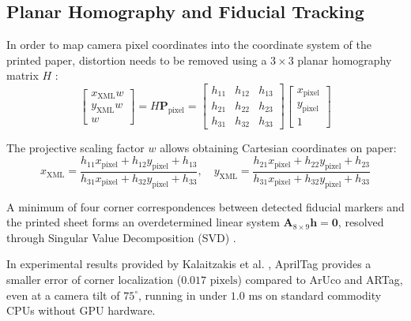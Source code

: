 \subsection{Planar Homography and Fiducial Tracking}
\label{subsec:lit_homography}
In order to map camera pixel coordinates into the coordinate system of the printed paper, distortion needs to be removed using a $3 \times 3$ planar homography matrix $H$ \cite{LonguetHiggins1985Machine, Pirchheim2011Homography, Wang2020Relative}:
\begin{equation}
\begin{bmatrix}
x_{\text{XML}} w \\
y_{\text{XML}} w \\
w
\end{bmatrix}
=
H \mathbf{P}_{\text{pixel}}
=
\begin{bmatrix}
h_{11} & h_{12} & h_{13} \\
h_{21} & h_{22} & h_{23} \\
h_{31} & h_{32} & h_{33}
\end{bmatrix}
\begin{bmatrix}
x_{\text{pixel}} \\
y_{\text{pixel}} \\
1
\end{bmatrix}
\label{eq:homography_equation_def}
\end{equation}

The projective scaling factor $w$ allows obtaining Cartesian coordinates on paper:
\begin{equation}
x_{\text{XML}} = \frac{h_{11} x_{\text{pixel}} + h_{12} y_{\text{pixel}} + h_{13}}{h_{31} x_{\text{pixel}} + h_{32} y_{\text{pixel}} + h_{33}}, \quad
y_{\text{XML}} = \frac{h_{21} x_{\text{pixel}} + h_{22} y_{\text{pixel}} + h_{23}}{h_{31} x_{\text{pixel}} + h_{32} y_{\text{pixel}} + h_{33}}
\label{eq:homography_cartesian_def}
\end{equation}

A minimum of four corner correspondences between detected fiducial markers and the printed sheet forms an overdetermined linear system $\mathbf{A}_{8 \times 9} \mathbf{h} = \mathbf{0}$, resolved through Singular Value Decomposition (SVD) \cite{Wang2016AprilTag2, Kallwies2020Determining}.

In experimental results provided by Kalaitzakis et al. \cite{Kalaitzakis2021Fiducial}, AprilTag provides a smaller error of corner localization ($0.017\text{ pixels}$) compared to ArUco and ARTag, even at a camera tilt of $75^\circ$, running in under $1.0\text{ ms}$ on standard commodity CPUs without GPU hardware.

